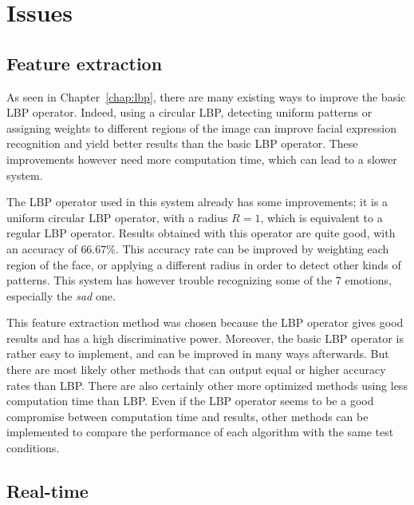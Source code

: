 \chapter{Issues}
\label{chap:eval_issues}

\section{Feature extraction}

\vspace{\baselineskip}
\noindent As seen in Chapter~\ref{chap:lbp}, there are many existing ways to improve the basic LBP operator. Indeed, using a circular LBP, detecting uniform patterns or assigning weights to different regions of the image can improve facial expression recognition and yield better results than the basic LBP operator. These improvements however need more computation time, which can lead to a slower system.
 \newline

\noindent The LBP operator used in this system already has some improvements; it is a uniform circular LBP operator, with a radius $R = 1$, which is equivalent to a regular LBP operator. Results obtained with this operator are quite good, with an accuracy of $ 66.67\% $. This accuracy rate can be improved by weighting each region of the face, or applying a different radius in order to detect other kinds of patterns. This system has however trouble recognizing some of the 7 emotions, especially the \textit{sad} one.
\newline

\noindent This feature extraction method was chosen because the LBP operator gives good results and has a high discriminative power. Moreover, the basic LBP operator is rather easy to implement, and can be improved in many ways afterwards. But there are most likely other methods that can output equal or higher accuracy rates than LBP.  There are also certainly other more optimized methods using less computation time than LBP. Even if the LBP operator seems to be a good compromise between computation time and results, other methods can be implemented to compare the performance of each algorithm with the same test conditions.
\newline

\section{Real-time}

